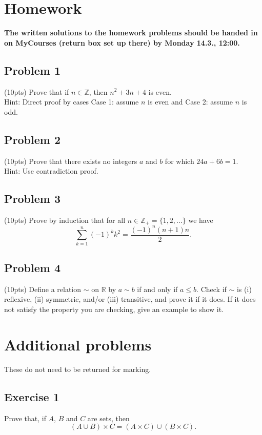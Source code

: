 \documentclass{amsart}
\newcommand{\Z}{\mathbb{Z}}
\newcommand{\R}{\mathbb{R}}
\theoremstyle{definition} \newtheorem*{definition}{Definition}
\theoremstyle{remark} \newtheorem*{ex}{Example}
\begin{document}
 \section*{Homework}
\textbf{The written solutions to the homework problems should be handed in on MyCourses (return box set up there) by Monday 14.3., 12:00.} 

\subsection*{Problem 1}
(10pts) Prove that if $n \in \Z$, then $n^2 + 3n + 4$ is even.\\
Hint: Direct proof by cases Case 1: assume $n$ is even and Case 2: assume $n$ is odd.

\subsection*{Problem 2}
(10pts) Prove that there exists no integers $a$ and $b$ for which $24a + 6b = 1$.\\
Hint: Use contradiction proof.

\subsection*{Problem 3}
(10pts) Prove by induction that for all $n \in \Z_+ = \{1,2,\dots\}$ we have
$$\sum_{k = 1}^n (-1)^k k^2  = \frac{(-1)^n (n+1)n}{2}.$$

\subsection*{Problem 4}
(10pts) Define a relation $\sim$ on $\R$ by $a \sim b$ if and only if $a \leq b$. Check if $\sim$ is (i) reflexive, (ii) symmetric, and/or (iii) transitive, and prove it if it does. If it does not satisfy the property you are checking, give an example to show it.

\pagebreak

\section*{Additional problems}

These do not need to be returned for marking.

\subsection*{Exercise 1}
Prove that, if $A$, $B$ and $C$ are sets, then $$(A\cup B)\times C = (A\times C) \cup (B\times C).$$
\end{document}
